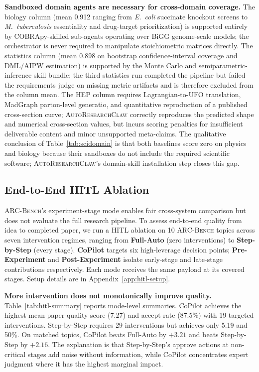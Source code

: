 \documentclass{llmxive}
\providecommand{\system}{\textsc{AutoResearchClaw}}
\providecommand{\bench}{\textsc{ARC-Bench}}
\begin{document}
\noindent \textbf{Sandboxed domain agents are necessary for cross-domain coverage.}
The biology column (mean 0.912 ranging from \emph{E.~coli} succinate knockout screens to \emph{M.~tuberculosis} essentiality and drug-target prioritization) is supported entirely by COBRApy-skilled sub-agents operating over BiGG genome-scale models; the orchestrator is never required to manipulate stoichiometric matrices directly.
The statistics column (mean 0.898 on bootstrap confidence-interval coverage and DML/AIPW estimation) is supported by the Monte Carlo and semiparametric-inference skill bundle; the third statistics run completed the pipeline but failed the requirements judge on missing metric artifacts and is therefore excluded from the column mean.
The HEP column requires Lagrangian-to-UFO translation, MadGraph parton-level generatio, and quantitative reproduction of a published cross-section curve; \system{} correctly reproduces the predicted shape and numerical cross-section values, but incurs scoring penalties for insufficient deliverable content and minor unsupported meta-claims.
The qualitative conclusion of Table~\ref{tab:scidomain} is that both baselines score zero on physics and biology because their sandboxes do not include the required scientific software; \system{}'s domain-skill installation step closes this gap.

\vspace{-0.3em}
\subsection{End-to-End HITL Ablation}
\label{sec:hitl_exp}
\vspace{-0.3em}

\bench{}'s experiment-stage mode enables fair cross-system comparison but does not evaluate the full research pipeline. To assess end-to-end quality from idea to completed paper, we run a HITL ablation on 10 \bench{} topics across seven intervention regimes, ranging from \textbf{Full-Auto} (zero interventions) to \textbf{Step-by-Step} (every stage). \textbf{CoPilot} targets six high-leverage decision points; \textbf{Pre-Experiment} and \textbf{Post-Experiment} isolate early-stage and late-stage contributions respectively. Each mode receives the same payload at its covered stages. Setup details are in Appendix~\ref{app:hitl-setup}.

\noindent \textbf{More intervention does not monotonically improve quality.} Table~\ref{tab:hitl-summary} reports mode-level summaries. CoPilot achieves the highest mean paper-quality score (7.27) and accept rate (87.5\%) with 19 targeted interventions. Step-by-Step requires 29 interventions but achieves only 5.19 and 50\%. On matched topics, CoPilot beats Full-Auto by $+3.21$ and beats Step-by-Step by $+2.16$. The explanation is that Step-by-Step's approve actions at non-critical stages add noise without information, while CoPilot concentrates expert judgment where it has the highest marginal impact.
\end{document}
